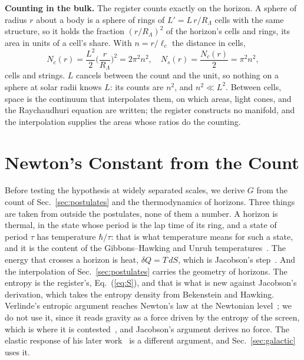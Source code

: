 \documentclass[aps,prd,twocolumn,superscriptaddress,nofootinbib,showkeys]{revtex4-2}
\newcommand{\lc}{\ell_c}
\newcommand{\RL}{R_\Lambda}
\begin{document}
\textbf{Counting in the bulk.} The register counts exactly on the horizon. A sphere of radius $r$ about a body is a sphere of rings of $L' = L\,r/\RL$ cells with the same structure, so it holds the fraction $(r/\RL)^2$ of the horizon's cells and rings, its area in units of a cell's share. With $n = r/\lc$ the distance in cells,
\begin{equation}
N_c(r) = \frac{L^2}{2}\Big(\frac{r}{\RL}\Big)^2 = 2\pi^2 n^2, \quad
N_s(r) = \frac{N_c(r)}{2} = \pi^2 n^2 ,
\label{eq:N}
\end{equation}
cells and strings. $L$ cancels between the count and the unit, so nothing on a sphere at solar radii knows $L$: its counts are $n^2$, and $n^2 \ll L^2$. Between cells, space is the continuum that interpolates them, on which areas, light cones, and the Raychaudhuri equation are written; the register constructs no manifold, and the interpolation supplies the areas whose ratios do the counting.

\section{Newton's Constant from the Count}
\label{sec:count}

Before testing the hypothesis at widely separated scales, we derive $G$ from the count of Sec.~\ref{sec:postulates} and the thermodynamics of horizons. Three things are taken from outside the postulates, none of them a number. A horizon is thermal, in the state whose period is the lap time of its ring, and a state of period $\tau$ has temperature $\hbar/\tau$: that is what temperature means for such a state, and it is the content of the Gibbons--Hawking and Unruh temperatures~\cite{gibbons1977,unruh1976}. The energy that crosses a horizon is heat, $\delta Q = T\,dS$, which is Jacobson's step~\cite{jacobson1995}. And the interpolation of Sec.~\ref{sec:postulates} carries the geometry of horizons. The entropy is the register's, Eq.~(\ref{eq:S}), and that is what is new against Jacobson's derivation, which takes the entropy density from Bekenstein and Hawking. Verlinde's entropic argument reaches Newton's law at the Newtonian level~\cite{verlinde2011}; we do not use it, since it reads gravity as a force driven by the entropy of the screen, which is where it is contested~\cite{visser2011,kobakhidze2011}, and Jacobson's argument derives no force. The elastic response of his later work~\cite{verlinde2017} is a different argument, and Sec.~\ref{sec:galactic} uses it.
\end{document}
